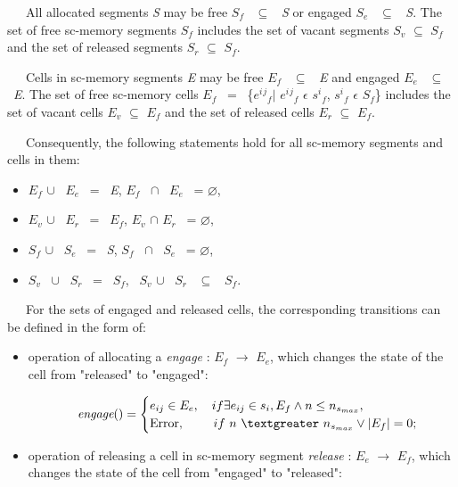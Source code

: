\documentclass[10pt, a4paper, twocolumn]{article}
\begin{document}
\par \ \ \ All allocated segments  \textit{ S}  may be free $\textit{S}_{f}$ \ $\subseteq$ \ \textit{S} or engaged  $S_{e}$ \ $\subseteq$ \ \textit{S}. The set of free sc-memory segments $S_{f}$ includes the set of vacant segments $S_{v}$ $\subseteq$ $S_{f}$ and the set of released segments $S_{r}$ $\subseteq$ $S_{f}$.
 \par \ \ \  Cells in sc-memory segments \textit{E} may be free $E_{f}$ \ $\subseteq$ \ \textit{E} and engaged $E_{e}$ \ $\subseteq$ \ \textit{E}. The set of free sc-memory cells $E_{f}$ \ = \ \{$e^i$$^j$$_{f}$$\vert$  $e^i$$^j$$_{f}$ $\epsilon$ $s^i$$_{f}$, $s^i$$_{f}$ $\epsilon$ $S_{f}$\} includes the set of vacant cells $E_{v}$  $\subseteq$ $E_{f}$ and the set of released cells $E_{r}$ $\subseteq$ $E_{f}$.
\par \ \ \ Consequently, the following statements hold for all sc-memory segments and cells in them:
\begin{itemize}[noitemsep,topsep=0pt,parsep=0pt,partopsep=0pt]
    \item $E_{f}$ $\cup$ \ $E_{e}$ \ = \  \textit{E},  $E_{f}$  \ $\cap$ \ $E_{e}$ \ = $\varnothing$, 
    \item $E_{v}$ $\cup$ \ $E_{r}$ \ =  \ $E_{f}$,  $E_{v}$ $\cap$ $E_{r}$ \ =  $\varnothing$, 
    \item $S_{f}$  $\cup$ \  $S_{e}$ \ = \ \textit{S},   $S_{f}$ \ $\cap$ \  $S_{e}$ \ = $\varnothing$,
    \item $S_{v}$ \ $\cup$ \ $S_{r}$ \ = \ $S_{f}$, \ $S_{v}$  $\cup$ \ $S_{r}$ \ $\subseteq$ \ $S_{f}$.
\end{itemize}
\par \ \ \ For the sets of engaged and released cells, the corresponding transitions can be defined in the form of: 
\begin{itemize}
    \item operation of allocating a \textit{engage} : $E_{f}$ $\xrightarrow{}$ $E_{e}$, which changes the state of the cell from "released" to "engaged":\end{itemize}
\[ \ \ \ \ \ \ \ \ \ \ \ \textit{engage}() = \begin{cases} e_{ij} \in E_{e},\ \ \ if \exists e_{ij} \in  s_{i},   E_{f} \wedge n \leq n_{s_{max}},  \\
\textrm{Error}, \ \ \ \ \ \ \ if \ n \ \textgreater \ n_{s_{max}} \vee \vert E_{f} \vert = 0;
\end{cases} \]
\begin{itemize}
    \item operation of releasing a cell in sc-memory segment \textit{release} :  $E_{e}$ $\xrightarrow{}$ $E_{f}$, which changes the state of the cell from "engaged" to "released": 

\end{itemize}$$
\end{document}
